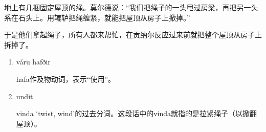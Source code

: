 \begin{translation*}{}
  地上有几捆固定屋顶的绳。莫尔德说：“我们把绳子的一头甩过房梁，再把另一头系在石头上。用辘轳把绳缠紧，就能把屋顶从房子上掀掉。”

  于是他们拿起绳子，所有人都来帮忙，在贡纳尔反应过来前就把整个屋顶从房子上拆掉了。
\end{translation*}
\begin{grammar*}{}
  \begin{enumerate}[leftmargin=*]
    \item váru hafðir

          hafa作及物动词，表示“使用”。
    \item undit

          vinda `twist, wind'的过去分词。这段话中的vinda就指的是拉紧绳子（以掀翻屋顶）。
  \end{enumerate}
\end{grammar*}

